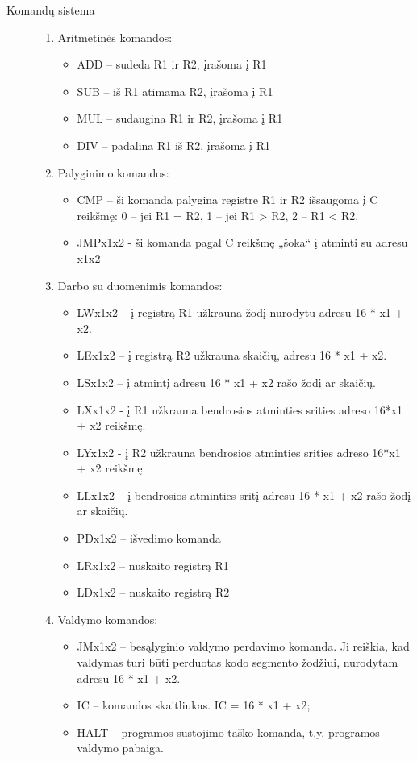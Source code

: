 \begin{description}
\item[Komandų sistema] \leavevmode 
\begin{enumerate}
\item Aritmetinės komandos: \leavevmode 
\begin{itemize}
\item ADD – sudeda R1 ir R2, įrašoma į R1
\item SUB – iš R1 atimama R2, įrašoma į R1
\item MUL – sudaugina R1 ir R2, įrašoma į R1
\item DIV – padalina R1 iš R2, įrašoma į R1
\end{itemize}
\item Palyginimo komandos:
\begin{itemize}
\item CMP – ši komanda palygina registre R1 ir R2 išsaugoma į C reikšmę: 0 – jei R1 = R2,  1 – jei R1 > R2, 2 –  R1 < R2.
\item JMPx1x2 - ši komanda pagal C reikšmę „šoka“ į atminti su adresu x1x2
\end{itemize}
\item  Darbo su duomenimis komandos:
\begin{itemize}
\item LWx1x2 – į registrą R1 užkrauna žodį nurodytu adresu 16 * x1 + x2.
\item LEx1x2 –  į registrą R2 užkrauna skaičių, adresu 16 * x1 + x2.
\item LSx1x2 –  į atmintį  adresu 16 * x1 + x2 rašo žodį ar skaičių.

\item LXx1x2 - į R1 užkrauna bendrosios atminties srities adreso 16*x1 + x2 reikšmę.
\item LYx1x2 - į R2 užkrauna bendrosios atminties srities adreso 16*x1 + x2 reikšmę.
\item LLx1x2 –  į bendrosios atminties sritį adresu 16 * x1 + x2 rašo žodį ar skaičių.

\item PDx1x2 –  išvedimo komanda

\item LRx1x2 –  nuskaito registrą R1
\item LDx1x2 –  nuskaito registrą R2
\end{itemize}
\item Valdymo komandos:
\begin{itemize}
\item JMx1x2 – besąlyginio valdymo perdavimo komanda. Ji reiškia, kad valdymas turi būti perduotas kodo segmento žodžiui, nurodytam adresu 16 * x1 + x2.
\item IC – komandos skaitliukas. IC = 16 * x1 + x2;
\item HALT – programos sustojimo taško komanda, t.y. programos valdymo pabaiga.
\end{itemize}
\end{enumerate}
\end{description}   
   
